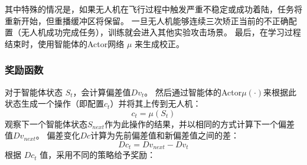 其中特殊的情况是，如果无人机在飞行过程中触发严重不稳定或成功着陆，任务将重新开始，但重播缓冲区将保留。
一旦无人机能够连续三次矫正当前的不正确配置（无人机成功完成任务），训练就会进入其他实验攻击场景。
最后，在学习过程结束时，使用智能体的Actor网络 $\mu$ 来生成校正。


\subsubsection{奖励函数}\label{subsec:fix_reward}
对于智能体状态 $S_t$，\nyctea 会计算偏差值$Dv_t$。
然后通过智能体的Actor$\mu(\cdot)$来根据此状态生成一个操作（即配置$c_t$）并将其上传到无人机：
\begin{equation}
    c_t = \mu(S_t)
\end{equation}
\nyctea 观察下一个智能体状态$S_{next}$作为此操作的结果，并以相同的方式计算下一个偏差值$Dv_{next}$。
偏差变化$Dc$计算为先前偏差值和新偏差值之间的差：
\begin{equation}
    Dc_t = Dv_{next} - Dv_t
\end{equation}
根据 $Dc_t$ 值，\nyctea 采用不同的策略给予奖励：

